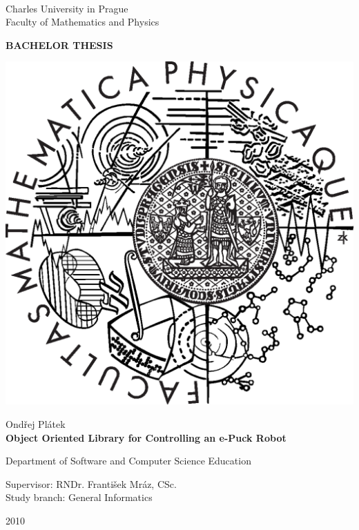 \documentclass[12pt,notitlepage]{report}
\begin{document}
\begin{titlepage}
\begin{center}
\ \\

\vspace{15mm}

\large
Charles University in Prague\\
Faculty of Mathematics and Physics\\

\vspace{5mm}

{\Large\bf BACHELOR THESIS}

\vspace{10mm}

\includegraphics[scale=0.3]{logo.eps} %

\vspace{15mm}
{\Large Ondřej Plátek}\\ 

\vspace{5mm}
{\Large\bf Object Oriented Library for Controlling an e-Puck Robot}

\vspace{20mm}
\large
\noindent
Department of Software and Computer Science Education

\noindent
 Supervisor: RNDr. František Mráz, CSc.\\
 Study branch: General Informatics\\
\end{center}
\vspace{20mm}
\begin{center}
2010
\end{center}

\end{titlepage} %
\end{document}
